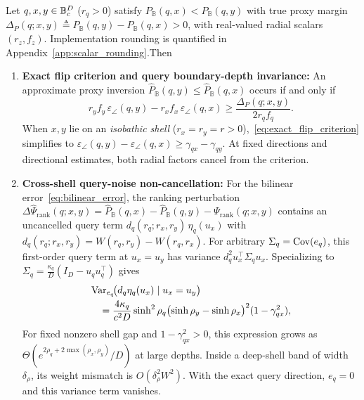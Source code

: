 \begin{theorem}
\label{thm:conformal_flip}
Let $q, x, y \in \mathbb{B}_c^D$ ($r_q > 0$) satisfy $P_{\mathbb{B}}(q, x) < P_{\mathbb{B}}(q, y)$ with true proxy margin $\Delta_P(q; x, y) \triangleq P_{\mathbb{B}}(q, y) - P_{\mathbb{B}}(q, x) > 0$, with real-valued radial scalars $(r_z,f_z)$. \ifpreprint Implementation rounding is quantified in Appendix~\ref{app:scalar_rounding}.\fi Then
\begin{enumerate}
  \item \textbf{Exact flip criterion and query boundary-depth invariance:}
  An approximate proxy inversion $\widehat{P}_{\mathbb{B}}(q, y) \le \widehat{P}_{\mathbb{B}}(q, x)$ occurs if and only if
  \begin{equation}
    r_y f_y\,\varepsilon_\angle(q, y) - r_x f_x\,\varepsilon_\angle(q, x)
    \ge \frac{\Delta_P(q; x, y)}{2 r_q f_q}.
    \label{eq:exact_flip_criterion}
  \end{equation}
  When $x, y$ lie on an \emph{isobathic shell} ($r_x = r_y = r > 0$),~\eqref{eq:exact_flip_criterion} simplifies to $\varepsilon_\angle(q, y) - \varepsilon_\angle(q, x) \ge \gamma_{qx} - \gamma_{qy}$. At fixed directions and directional estimates, both radial factors cancel from the criterion.

  \item \textbf{Cross-shell query-noise non-cancellation:}
  For the bilinear error~\eqref{eq:bilinear_error}, the ranking perturbation $\Delta\widehat{\Psi}_{\mathrm{rank}}(q; x, y) = \widehat{P}_{\mathbb{B}}(q, x) - \widehat{P}_{\mathbb{B}}(q, y) - \Psi_{\mathrm{rank}}(q; x, y)$ contains an uncancelled query term $d_q(r_q; r_x, r_y)\,\eta_q(u_x)$ with $d_q(r_q; r_x, r_y) = W(r_q, r_y) - W(r_q, r_x)$.
  For arbitrary $\Sigma_q=\operatorname{Cov}(e_q)$, this first-order query term at $u_x=u_y$ has variance $d_q^2u_x^\top\Sigma_q u_x$. Specializing to $\Sigma_q=\frac{\kappa_q}{D}(I_D-u_qu_q^\top)$ gives
  \begin{equation}
    \begin{aligned}
      &\operatorname{Var}_{e_q}\!\bigl(d_q\eta_q(u_x)\mid u_x=u_y\bigr) \\
      &\quad= \frac{4\kappa_q}{c^2 D}\sinh^2\rho_q
        \bigl(\sinh\rho_y - \sinh\rho_x\bigr)^2(1 - \gamma_{qx}^2),
    \end{aligned}
    \label{eq:cross_shell_var}
  \end{equation}
  For fixed nonzero shell gap and $1-\gamma_{qx}^2>0$, this expression grows as $\Theta(e^{2\rho_q+2\max(\rho_x,\rho_y)}/D)$ at large depths. Inside a deep-shell band of width $\delta_\rho$, its weight mismatch is $O(\delta_\rho^2W^2)$. With the exact query direction, $e_q=0$ and this variance term vanishes.


\end{enumerate}
\end{theorem}
